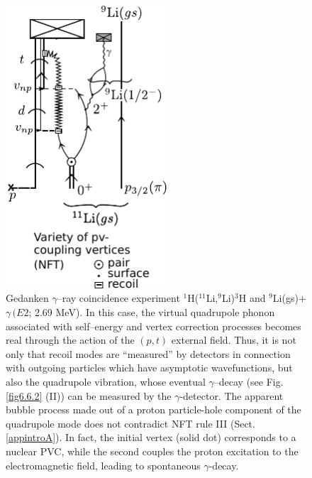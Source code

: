           \begin{figure}
          \centerline {
          \includegraphics*[width=6cm]{introduccion/figs/figintro6xxx}
          }
          \caption{Gedanken $\gamma$--ray coincidence experiment $^1$H($^{11}$Li,$^9$Li)$^3$H and $^9$Li(gs)+$\gamma\, (E2$; 2.69 MeV). In  this case, the virtual quadrupole phonon associated with self--energy and vertex correction processes becomes real through the action of the $(p,t)$ external field. Thus, it is not only that recoil modes are ``measured'' by  detectors in connection with outgoing particles which have  asymptotic wavefunctions, but also the quadrupole vibration, whose eventual $\gamma$--decay (see Fig. \ref{fig6.6.2} (II)) can be  measured by the $\gamma$-detector. The apparent bubble process made out of a proton particle-hole component of the quadrupole mode does not contradict NFT rule III (Sect. \ref{appintroA}). In fact, the initial vertex (solid dot) corresponds to a nuclear PVC, while the second couples the proton excitation to the electromagnetic field, leading to spontaneous $\gamma$-decay.}
          \label{figintro6x}
          \end{figure}
